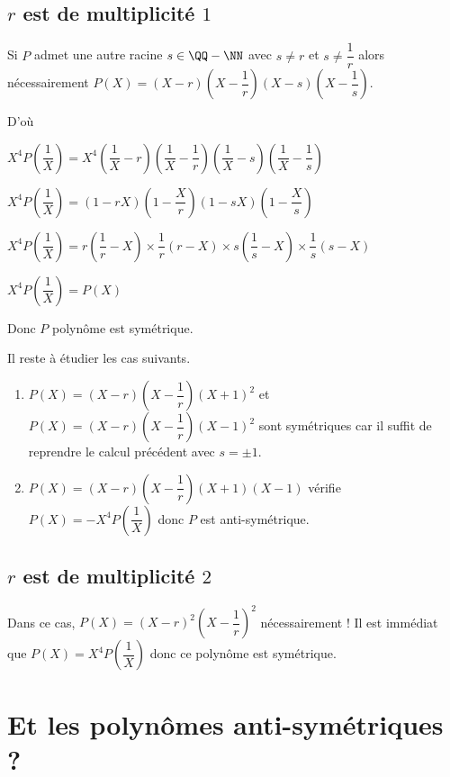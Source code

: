\documentclass[12pt]{amsart}
\begin{document}
\subsection*{$r$ est de multiplicité $1$}

Si $P$ admet une autre racine $s \in \QQ - \NN$ avec $s \neq r$ et $s \neq \dfrac1r$ alors nécessairement $P(X) = (X - r) \left( X - \dfrac1r \right) (X - s) \left( X - \dfrac1s \right)$.


D'où

$X^4 P\left( \dfrac1X \right)
= X^4 
  \left( \dfrac1X - r \right) \left( \dfrac1X - \dfrac1r \right) 
  \left( \dfrac1X - s \right) \left( \dfrac1X - \dfrac1s \right)$

$X^4 P\left( \dfrac1X \right)
= ( 1 - r X) \left( 1 - \dfrac{X}{r} \right) 
  ( 1 - s X) \left( 1 - \dfrac{X}{s} \right)$

$X^4 P\left( \dfrac1X \right)
= r \left( \dfrac1r - X \right) \times \dfrac1r ( r - X) 
  \times s \left( \dfrac1s - X \right) \times \dfrac1s ( s - X)$

$X^4 P\left( \dfrac1X \right)
= P(X)$

\medskip

Donc $P$ polynôme est symétrique.


\bigskip

Il reste à étudier les cas suivants.

\begin{enumerate}
	\item $P(X) = (X - r) \left( X - \dfrac1r \right) (X + 1)^2$ et $P(X) = (X - r) \left( X - \dfrac1r \right) (X - 1)^2$ sont symétriques car il suffit de reprendre le calcul précédent avec $s = \pm 1$.
	

	\item $P(X) = (X - r) \left( X - \dfrac1r \right) (X + 1) (X - 1)$ vérifie $P(X) = - X^4 P\left( \dfrac1X \right)$ donc $P$ est anti-symétrique.
\end{enumerate}


\subsection*{$r$ est de multiplicité $2$}

Dans ce cas, $P(X) = (X - r)^2 \left( X - \dfrac1r \right)^2$ nécessairement !
Il est immédiat que $P(X) = X^4 P\left( \dfrac1X \right)$ donc ce polynôme est symétrique.



\section{Et les polynômes anti-symétriques ?}
\end{document}
